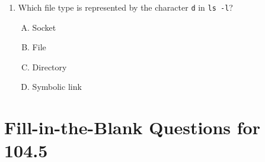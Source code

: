 \documentclass[a4paper]{report}
\begin{document}
\begin{enumerate}[1.]
    \item Which file type is represented by the character \texttt{d} in \texttt{ls -l}?  
    \begin{enumerate}[A)]
        \item Socket  
        \item File  
        \item Directory  
        \item Symbolic link  
    \end{enumerate}

\end{enumerate}
\newpage
\section*{Fill-in-the-Blank Questions for 104.5}
\end{document}
